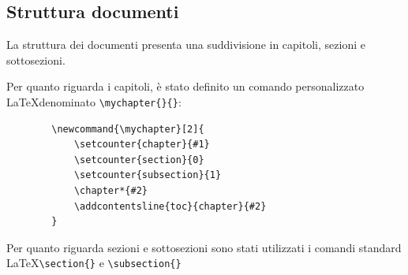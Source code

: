 \documentclass[a4paper]{report}
\newcommand{\mychapter}[2]{
	\setcounter{chapter}{#1}
	\setcounter{section}{0}
	\setcounter{subsection}{1}
	\chapter*{#2}
	\addcontentsline{toc}{chapter}{#2}
}
\begin{document}
	\subsection{Struttura documenti}
	La struttura dei documenti presenta una suddivisione in capitoli, sezioni e sottosezioni. 
	
	Per quanto riguarda i capitoli, è stato definito un comando personalizzato \LaTeX \space denominato
	\verb|\mychapter{}{}|:
	\begin{verbatim}
		\newcommand{\mychapter}[2]{
			\setcounter{chapter}{#1}
			\setcounter{section}{0}
			\setcounter{subsection}{1}
			\chapter*{#2}
			\addcontentsline{toc}{chapter}{#2}
		}
	\end{verbatim}
	Per quanto riguarda sezioni e sottosezioni sono stati utilizzati i comandi standard \LaTeX \space \verb|\section{}| e
	\verb|\subsection{}| 
\end{document}
